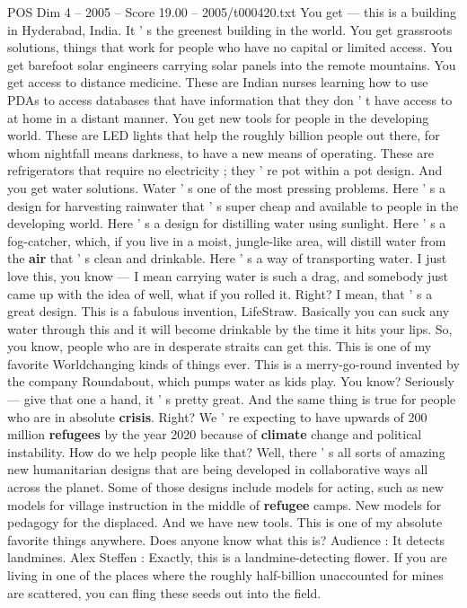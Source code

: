 \begin{textsample}{POS Dim 4 – 2005 – Score 19.00 – 2005/t000420.txt}
You get — this is a building in Hyderabad, India.
It ' s the greenest building in the world.
You get grassroots solutions, things that work for people who have no capital or limited access.
You get barefoot solar engineers carrying solar panels into the remote mountains.
You get access to distance medicine.
These are Indian nurses learning how to use PDAs to access databases that have information that they don ' t have access to at home in a distant manner.
You get new tools for people in the developing world.
These are LED lights that help the roughly billion people out there, for whom nightfall means darkness, to have a new means of operating.
These are refrigerators that require no electricity ; they ' re pot within a pot design.
And you get water solutions.
Water ' s one of the most pressing problems.
Here ' s a design for harvesting rainwater that ' s super cheap and available to people in the developing world.
Here ' s a design for distilling water using sunlight.
Here ' s a fog-catcher, which, if you live in a moist, jungle-like area, will distill water from the \textbf{air} that ' s clean and drinkable.
Here ' s a way of transporting water.
I just love this, you know — I mean carrying water is such a drag, and somebody just came up with the idea of well, what if you rolled it.
Right?
I mean, that ' s a great design.
This is a fabulous invention, LifeStraw.
Basically you can suck any water through this and it will become drinkable by the time it hits your lips.
So, you know, people who are in desperate straits can get this.
This is one of my favorite Worldchanging kinds of things ever.
This is a merry-go-round invented by the company Roundabout, which pumps water as kids play.
You know?
Seriously — give that one a hand, it ' s pretty great.
And the same thing is true for people who are in absolute \textbf{crisis}.
Right?
We ' re expecting to have upwards of 200 million \textbf{refugees} by the year 2020 because of \textbf{climate} change and political instability.
How do we help people like that?
Well, there ' s all sorts of amazing new humanitarian designs that are being developed in collaborative ways all across the planet.
Some of those designs include models for acting, such as new models for village instruction in the middle of \textbf{refugee} camps.
New models for pedagogy for the displaced.
And we have new tools.
This is one of my absolute favorite things anywhere.
Does anyone know what this is?
Audience : It detects landmines.
Alex Steffen : Exactly, this is a landmine-detecting flower.
If you are living in one of the places where the roughly half-billion unaccounted for mines are scattered, you can fling these seeds out into the field.

\end{textsample}
